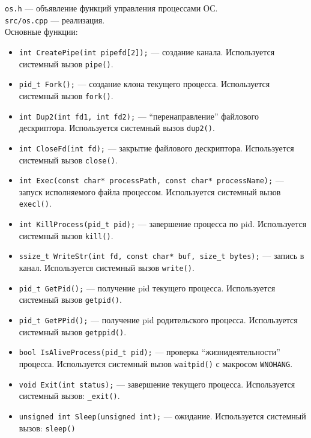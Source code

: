 \texttt{os.h} --- объявление функций управления процессами ОС. \\ 
\texttt{src/os.cpp} --- реализация.\\
Основные функции:
\begin{itemize}
\item \texttt{int CreatePipe(int pipefd[2]);} --- создание канала. Используется системный вызов \texttt{pipe()}.
\item \texttt{pid\_t Fork();} --- создание клона текущего процесса. Используется системный вызов \texttt{fork()}.
\item \texttt{int Dup2(int fd1, int fd2);} --- ``перенаправление'' файлового дескриптора. Используется системный вызов \texttt{dup2()}.
\item \texttt{int CloseFd(int fd);} --- закрытие файлового дескриптора. Используется системный вызов \texttt{close()}.
\item \texttt{int Exec(const char* processPath, const char* processName);} --- запуск исполняемого файла процессом. Используется системный вызов \texttt{execl()}.
\item \texttt{int KillProcess(pid\_t pid);} --- завершение процесса по pid. Используется системный вызов \texttt{kill()}.
\item \texttt{ssize\_t WriteStr(int fd, const char* buf, size\_t bytes);} --- запись в канал. Используется системный вызов \texttt{write()}.
\item \texttt{pid\_t GetPid();} --- получение pid текущего процесса. Используется системный вызов \texttt{getpid()}.
\item \texttt{pid\_t GetPPid();} --- получение pid родительского процесса. Используется системный вызов \texttt{getppid()}.
\item \texttt{bool IsAliveProcess(pid\_t pid);} --- проверка ``жизнидеятельности'' процесса. Используется системный вызов \texttt{waitpid()} с макросом \texttt{WNOHANG}.
\item \texttt{void Exit(int status);} --- завершение текущего процесса. Используется системный вызов: \texttt{\_exit()}.
\item \texttt{unsigned int Sleep(unsigned int);} --- ожидание. Используется системный вызов: \texttt{sleep()}
\end{itemize}

\vspace{2\baselineskip}


